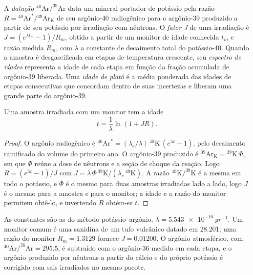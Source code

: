 \begin{definition}
\label{def:b3:advanced-geochronology:arar}
A \emph{datação $^{40}\mathrm{Ar}/^{39}\mathrm{Ar}$}
data um mineral portador de potássio pela razão $R =
{}^{40}\mathrm{Ar}^*/{}^{39}\mathrm{Ar}_{\mathrm K}$ de seu argônio-40
radiogênico para o argônio-39 produzido a partir de seu potássio por irradiação com nêutrons. O
\emph{fator J} de uma irradiação é $J = (e^{\lambda
t_m} - 1)/R_m$, obtido a partir de um monitor de idade conhecida $t_m$ e razão medida
$R_m$, com $\lambda$ a constante de decaimento total do potássio-40. Quando a amostra
é desgaseificada em etapas de temperatura crescente, seu \emph{espectro de
idades} representa a idade de cada etapa em função da
fração acumulada de argônio-39 liberada. Uma \emph{idade de
platô} é a média ponderada das idades de etapas consecutivas que
concordam dentro de suas incertezas e liberam uma grande parte do argônio-39.
\end{definition}

\begin{theorem}\label{thm:b3:advanced-geochronology:arar}
Uma amostra irradiada com um monitor tem a idade
\[
t = \frac1\lambda\ln(1 + JR).
\]
\end{theorem}

\begin{proof}
O argônio radiogênico é $^{40}\mathrm{Ar}^* = (\lambda_e/\lambda)\,
{}^{40}\mathrm{K}\,(e^{\lambda t} - 1)$, pelo decaimento ramificado do volume do primeiro ano. O
argônio-39 produzido é $^{39}\mathrm{Ar}_{\mathrm K} =
{}^{39}\mathrm{K}\,\Phi$, em que $\Phi$ reúne a dose de nêutrons e a
seção de choque da reação. Logo $R = (e^{\lambda t} - 1)/J$ com $J =
\lambda\,\Phi\,{}^{39}\mathrm{K}/(\lambda_e\,{}^{40}\mathrm{K})$. A razão
$^{40}\mathrm{K}/^{39}\mathrm{K}$ é a mesma em todo o potássio, e $\Phi$ é o
mesmo para duas amostras irradiadas lado a lado, logo $J$ é o mesmo para a amostra
e para o monitor; a idade e a razão do monitor permitem obtê-lo, e invertendo $R$ obtém-se
$t$.
\end{proof}

As constantes são as do método potássio--argônio, $\lambda =
\qty{5.543e-10}{yr^{-1}}$. Um monitor comum é uma sanidina de um tufo vulcânico
datado em \qty{28.201}{\Ma}; uma razão do monitor $R_m = 1.3129$ fornece $J =
0.01200$. O argônio atmosférico, com $^{40}\mathrm{Ar}/^{36}\mathrm{Ar} = 295.5$,
é subtraído com o argônio-36 medido em cada etapa, e o argônio produzido por
nêutrons a partir do cálcio e do próprio potássio é corrigido com sais
irradiados no mesmo pacote.

